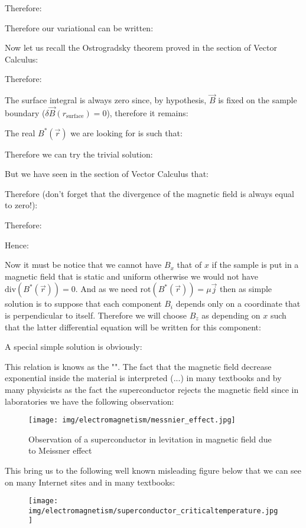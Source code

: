	Therefore:
	
	Therefore our variational can be written:
	
	Now let us recall the Ostrogradsky theorem proved in the section of Vector Calculus:
	
	Therefore:
	
	The surface integral is always zero since, by hypothesis, $\vec{B}$ is fixed on the sample boundary ($\delta\vec{B}(r_\text{surface})=0$), therefore it remains:
	
	The real $B^{*}(\vec{r})$ we are looking for is such that:
	
	Therefore we can try the trivial solution:
	
	But we have seen in the section of Vector Calculus that:
	
	Therefore (don't forget that the divergence of the magnetic field is always equal to zero!):
	
	Therefore:
	
	Hence:
	
	Now it must be notice that we cannot have $B_x$ that of $x$ if the sample is put in a magnetic field that is static and uniform otherwise we would not have $\text{div}(B^{*}(\vec{r}))=0$. And as we need $\text{rot}(B^{*}(\vec{r}))=\mu\vec{j}$ then as simple solution is to suppose that each component $B_i$ depends only on a coordinate that is perpendicular to itself. Therefore we will choose $B_z$ as depending on $x$ such that the latter differential equation will be written for this component:
	
	A special simple solution is obviously:
	
	This relation is knows as the "". The fact that the magnetic field decrease exponential inside the material is interpreted (...) in many textbooks and by many physicists as the fact the superconductor rejects the magnetic field since in laboratories we have the following observation:
	\begin{figure}[H]
		\centering
		\texttt{[image: img/electromagnetism/messnier\_effect.jpg]}
		\caption{Observation of a superconductor in levitation in magnetic field due to Meissner effect}
	\end{figure}
	This bring us to the following well known misleading figure below that we can see on many Internet sites and in many textbooks:
	\begin{figure}[H]
		\centering
		\texttt{[image: img/electromagnetism/superconductor\_criticaltemperature.jpg]}
	\end{figure}
	
